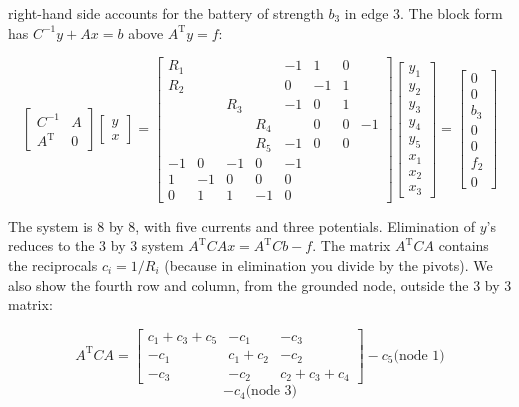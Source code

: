 right-hand side accounts for the battery of strength \(b_{3}\) in edge 3. The block form has \(C^{-1}y+Ax=b\) above \(A^{\mathrm{T}}y=f\):

\[\begin{bmatrix}C^{-1}&A\\ A^{\mathrm{T}}&0\end{bmatrix}\begin{bmatrix}y\\ x\end{bmatrix}=\begin{bmatrix}R_{1}&&&&-1&1&0\\ R_{2}&&&&0&-1&1\\ &&R_{3}&&-1&0&1\\ &&&R_{4}&&0&0&-1\\ &&&R_{5}&-1&0&0\\ -1&0&-1&0&-1&&&\\ 1&-1&0&0&0&&\\ 0&1&1&-1&0&&&\end{bmatrix}\begin{bmatrix}y_{1}\\ y_{2}\\ y_{3}\\ y_{4}\\ y_{5}\\ x_{1}\\ x_{2}\\ x_{3}\end{bmatrix}=\begin{bmatrix}0\\ 0\\ b_{3}\\ 0\\ 0\\ f_{2}\\ 0\end{bmatrix}\]

The system is 8 by 8, with five currents and three potentials. Elimination of \(y\)'s reduces to the 3 by 3 system \(A^{\mathrm{T}}CAx=A^{\mathrm{T}}Cb-f\). The matrix \(A^{\mathrm{T}}CA\) contains the reciprocals \(c_{i}=1/R_{i}\) (because in elimination you divide by the pivots). We also show the fourth row and column, from the grounded node, outside the 3 by 3 matrix:

\[A^{\mathrm{T}}CA=\begin{bmatrix}c_{1}+c_{3}+c_{5}&-c_{1}&-c_{3}\\ -c_{1}&c_{1}+c_{2}&-c_{2}\\ -c_{3}&-c_{2}&c_{2}+c_{3}+c_{4}\end{bmatrix}-c_{5} \text{(node 1)}\] \[-c_{4} \text{(node 3)}\]

